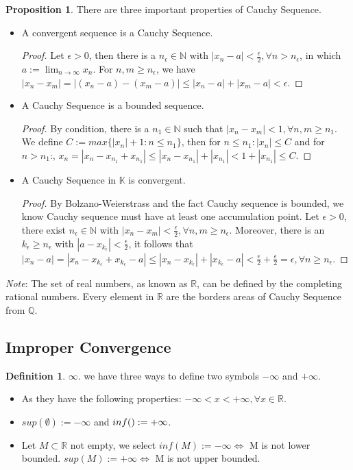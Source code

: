 \documentclass{article}
\theoremstyle{definition}
\newtheorem{defi}{Definition}[subsection]
\newtheorem{prop}{Proposition}[subsection]
\begin{document}
\begin{prop}
There are three important properties of Cauchy Sequence.
\begin{itemize}
\item A convergent sequence is a Cauchy Sequence.
    \begin{proof}
    Let $\epsilon>0$, then there is a $n_\epsilon\in\mathbb{N}$ with $|x_n-a|<\frac{\epsilon}{2}, \forall n>n_\epsilon$, in which $a := \lim_{n\to\infty}x_n$. For $n,m \geq n_\epsilon$, we have $|x_n-x_m|=|(x_n-a) - (x_m-a)| \leq |x_n-a| + |x_m-a|<\epsilon$.
    \end{proof}
    \item A Cauchy Sequence is a bounded sequence.
    \begin{proof}
    By condition, there is a $n_1\in\mathbb{N}$ such that $|x_n-x_m|<1, \forall n,m \geq n_1$. We define $C := max\{|x_n|+1: n\leq n_1\}$, then for $n\leq n_1: |x_n|\leq C$ and for $n>n_1$:, $x_n=|x_n-x_{n_1}+x_{n_1}| \leq |x_n-x_{n_1}| + |x_{n_{1}}|< 1 + |x_{n_1}|\leq C$.
    \end{proof}
    \item A Cauchy Sequence in $\mathbb{K}$ is convergent.
    \begin{proof}
    By Bolzano-Weierstrass and the fact Cauchy sequence is bounded, we know Cauchy sequence must have at least one accumulation point. Let $\epsilon>0$, there exist $n_\epsilon\in\mathbb{N}$ with $|x_n-x_m|< \frac{\epsilon}{2}, \forall n,m \geq n_\epsilon$. Moreover, there is an $k_\epsilon\geq n_\epsilon$ with $|a-x_{k_{\epsilon}}|<\frac{\epsilon}{2}$, it follows that $|x_n-a| = |x_n-x_{k_{\epsilon}}+x_{k_{\epsilon}}-a| \leq |x_n-x_{k_{\epsilon}}| + |x_{k_{\epsilon}} - a|<\frac{\epsilon}{2} + \frac{\epsilon}{2} = \epsilon, \forall n\geq n_\epsilon$. 
    \end{proof}

\end{itemize}
\end{prop}

\textit{Note}: The set of real numbers, as known as $\mathbb{R}$, can be defined by the completing rational numbers. Every element in $\mathbb{R}$ are the borders areas of Cauchy Sequence from $\mathbb{Q}$.

\subsection{Improper Convergence}

\begin{defi}
\textbf{$\infty$}. we have three ways to define two symbols $-\infty$ and $+\infty$.
\begin{itemize}
    \item As they have the following properties: $-\infty < x < +\infty, \forall x\in\mathbb{R}$.
    \item $sup(\emptyset):=-\infty$ and $inf(\empty):=+\infty$.
    \item Let $M\subset \mathbb{R}$ not empty, we select $inf(M) := -\infty \Leftrightarrow$ M is not lower bounded. $sup(M):= +\infty \Leftrightarrow$ M is not upper bounded. 
\end{itemize}
\end{defi}
\end{document}
